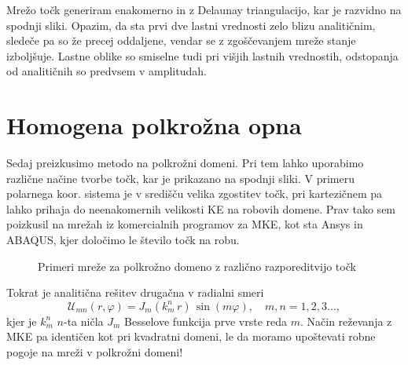 Mrežo točk generiram enakomerno in z Delaunay triangulacijo, kar je razvidno na spodnji sliki. Opazim, da sta prvi dve lastni vrednosti zelo blizu analitičnim, sledeče pa so že precej oddaljene, vendar se z zgoščevanjem mreže stanje izboljšuje. Lastne oblike so smiselne tudi pri višjih lastnih vrednostih, odstopanja od analitičnih so predvsem v amplitudah.

\begin{figure}[H]
    \centering
\end{figure}


\section{Homogena polkrožna opna}

Sedaj preizkusimo metodo na polkrožni domeni. Pri tem lahko uporabimo različne načine tvorbe točk, kar je prikazano na spodnji sliki. V primeru polarnega koor. sistema je v središču velika zgostitev točk, pri kartezičnem pa lahko prihaja do neenakomernih velikosti KE na robovih domene. Prav tako sem poizkusil na mrežah iz komercialnih programov za MKE, kot sta Ansys in ABAQUS, kjer določimo le število točk na robu.

\begin{figure}[H]
    \centering
    \caption{Primeri mreže za polkrožno domeno z različno razporeditvijo točk}
\end{figure}

Tokrat je analitična rešitev drugačna v radialni smeri 
\begin{equation}
    \mathcal{U}_{m n}(r,\varphi) = J_m\left(k_{m}^n\, r\right)\,\sin(m \varphi), \quad m,n = 1,2,3\ldots,
\end{equation}
kjer je $k_{m}^n$ $n$-ta ničla $J_m$ Besselove funkcija prve vrste reda $m$. Način reževanja z MKE pa identičen kot pri kvadratni domeni, le da moramo upoštevati robne pogoje na mreži v polkrožni domeni!

